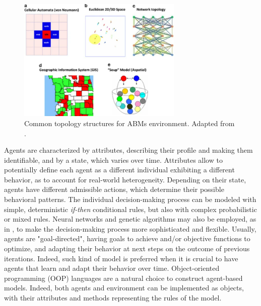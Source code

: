\begin{figure}
    \centering
    \includegraphics[width=0.7\textwidth]{tex/pics/abm_topologies.png}
    \caption{Common topology structures for ABMs environment. Adapted from \textcite{tutorialABM1}.}
    \label{topologies}
\end{figure}

Agents are characterized by attributes, describing their profile and making them identifiable, and by a state, which varies over time. Attributes allow to potentially define each agent as a different individual exhibiting a different behavior, as to account for real-world heterogeneity. Depending on their state, agents have different admissible actions, which determine their possible behavioral patterns. The individual decision-making process can be modeled with simple, deterministic \textit{if-then} conditional rules, but also with complex probabilistic or mixed rules. Neural networks and genetic algorithms may also be employed, as in \textcite{ALKINANI20228325, abm_rl}, to make the decision-making process more sophisticated and flexible. Usually, agents are "goal-directed", having goals to achieve and/or objective functions to optimize, and adapting their behavior at next steps on the outcome of previous iterations. Indeed, such kind of model is preferred when it is crucial to have agents that learn and adapt their behavior over time.
Object-oriented programming (OOP) languages are a natural choice to construct agent-based models. Indeed, both agents and environment can be implemented as objects, with their attributes and methods representing the rules of the model. 
  
